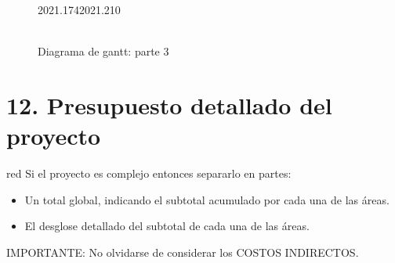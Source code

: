 \documentclass[
11pt, %
]{charter}
\begin{document}
\begin{landscape}
	
	\begin{figure}[htbp]
		\begin{center}
			\begin{ganttchart}[
				hgrid,
				vgrid,
				time slot format=stardate
				]{2021.174}{2021.210}
				 \\
				 \\
				 \ganttnewline
				 \ganttnewline
				 \ganttnewline
				 \ganttnewline
				 \ganttnewline
			\end{ganttchart}
		\end{center}
		\caption{Diagrama de gantt: parte 3}
		\label{fig:gantt3}
	\end{figure}
	
\end{landscape}


\section{12. Presupuesto detallado del proyecto}
\label{sec:presupuesto}

\begin{consigna}{red}
Si el proyecto es complejo entonces separarlo en partes:
\begin{itemize}
	\item Un total global, indicando el subtotal acumulado por cada una de las áreas.
	\item El desglose detallado del subtotal de cada una de las áreas.
\end{itemize}

IMPORTANTE: No olvidarse de considerar los COSTOS INDIRECTOS.

\end{consigna}
\end{document}
